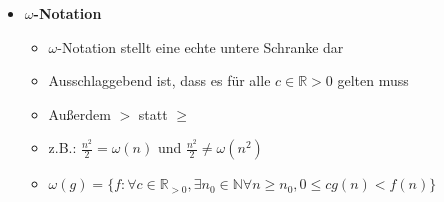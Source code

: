 \documentclass[
    12pt,
    a4paper,
    ngerman,
    color=3b,%
    marginpar=false,
    colorback=false,
    leqno,
]{tudaexercise}
\begin{document}
\begin{itemize}
    \item \textbf{$\omega$-Notation}
          \begin{itemize}
              \item $\omega$-Notation stellt eine echte untere Schranke dar
              \item Ausschlaggebend ist, dass es für alle $c \in \mathbb{R}{>0}$ gelten muss
              \item Au\ss erdem $>$ statt $\geq$
              \item z.B.: $\frac{n^2}{2} = \omega(n)$ und $\frac{n^2}{2} \neq \omega(n^2)$
              \item[] %
                    $\omega(g)=\{f:\forall c \in \mathbb{R}_{>0},\exists n_0 \in \mathbb{N} \forall n \geq n_0,0\leq cg(n)<f(n)\}$
          \end{itemize}
\end{itemize}
\clearpage
\end{document}
